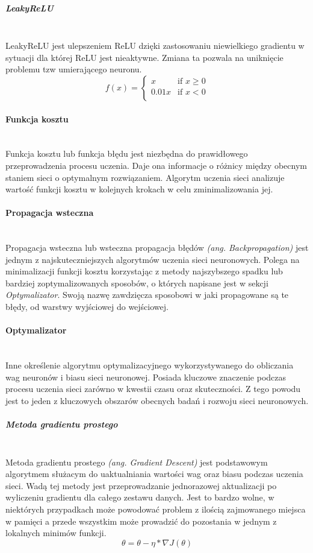 \subparagraph{LeakyReLU} \mbox{}\\
LeakyReLU jest ulepszeniem ReLU dzięki zastosowaniu niewielkiego gradientu w sytuacji
dla której ReLU jest nieaktywne. Zmiana ta pozwala na uniknięcie problemu tzw
umierającego neuronu.
\begin{equation}
f(x) =
\begin{cases}
 x & \text{if } x \geqslant 0 \\
 0.01x & \text{if } x < 0 \\
\end{cases}
\end{equation}

\paragraph{Funkcja kosztu} \mbox{}\\
Funkcja kosztu lub funkcja błędu jest niezbędna do prawidłowego przeprowadzenia
procesu uczenia. Daje ona informacje o różnicy między obecnym staniem sieci o
optymalnym rozwiązaniem. Algorytm uczenia sieci analizuje wartość funkcji kosztu
w kolejnych krokach w celu zminimalizowania jej.

\paragraph{Propagacja wsteczna} \mbox{}\\
Propagacja wsteczna lub wsteczna propagacja błędów \textit{(ang. Backpropagation)}
jest jednym z najskuteczniejszych algorytmów uczenia sieci neuronowych. Polega
na minimalizacji funkcji kosztu korzystając z metody najszybszego spadku lub
bardziej zoptymalizowanych sposobów, o których napisane jest w sekcji \textit{Optymalizator}.
Swoją nazwę zawdzięcza sposobowi w jaki propagowane są te błędy, od warstwy
wyjściowej do wejściowej.

\paragraph{Optymalizator} \mbox{}\\
Inne określenie algorytmu optymalizacyjnego wykorzystywanego do obliczania wag neuronów
i biasu sieci neuronowej. Posiada kluczowe znaczenie podczas procesu uczenia sieci
zarówno w kwestii czasu oraz skuteczności. Z tego powodu jest to jeden z kluczowych
obszarów obecnych badań i rozwoju sieci neuronowych.

\subparagraph{Metoda gradientu prostego} \mbox{}\\
Metoda gradientu prostego \textit{(ang. Gradient Descent)} jest podstawowym algorytmem
służacym do uaktualniania wartości wag oraz biasu podczas uczenia sieci. Wadą tej
metody jest przeprowadzanie jednorazowej aktualizacji po wyliczeniu gradientu dla
całego zestawu danych. Jest to bardzo wolne, w niektórych przypadkach może powodować
problem z ilością zajmowanego miejsca w pamięci a przede wszystkim może prowadzić
do pozostania w jednym z lokalnych minimów funkcji.
\begin{equation}
\theta = \theta - \eta * \nabla J(\theta)
\end{equation}

